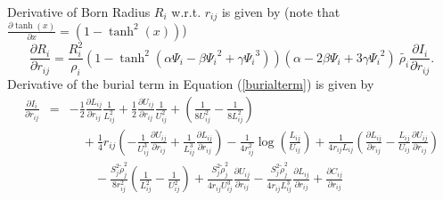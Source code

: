 \documentclass[12pt]{article}
\begin{document}
Derivative of Born Radius $R_{i}$ w.r.t. $r_{ij}$ is given by
(note that $\frac{\partial \tanh(x)}{\partial x} = (1-\tanh^{2}(x))$)
\begin{equation}
\label{bornradiiderivative}
\frac{\partial R_{i}}{\partial r_{ij}} = \frac{R_{i}^{2}}{\rho_{i}}\left(1 - {\tanh}^{2}\left({{\alpha}{\Psi_{i}} - {\beta}{\Psi_{i}}^{2} + {\gamma}
     {\Psi_{i}}^{3}}\right)\right)\left({\alpha} - 2{\beta}{\Psi_{i}} + 3{\gamma}{\Psi_{i}}^{2}\right)
     ~\tilde{\rho_{i}}\frac{\partial {I_{i}}}{\partial r_{ij}}
     .
\end{equation}
Derivative of the burial term in Equation (\ref{burialterm}) is given by
\begin{eqnarray}
\frac{\partial I_{i}}{\partial r_{ij}} & = & -\frac{1}{2}\frac{\partial L_{ij}}{\partial r_{ij}}\frac{1}{L_{ij}^2} + 
  \frac{1}{2}\frac{\partial U_{ij}}{\partial r_{ij}}\frac{1}{U_{ij}^2} + \left(\frac{1}{8 U_{ij}^2}-\frac{1}{8 L_{ij}^2}\right) \nonumber \\
  & & \quad + \frac{1}{4}r_{ij}
  \left(-\frac{1}{U_{ij}^{3}}\frac{\partial U_{ij}}{\partial r_{ij}}
  + \frac{1}{L_{ij}^{3}}\frac{\partial L_{ij}}{\partial r_{ij}}\right)
  -\frac{1}{4r_{ij}^{2}}\log\left({\frac{L_{ij}}{U_{ij}}}\right) +
  \frac{1}{4r_{ij}L_{ij}}\left(\frac{\partial L_{ij}}{\partial r_{ij}} - \frac{L_{ij}}{U_{ij}}\frac{\partial U_{ij}}{\partial r_{ij} } \right) \nonumber \\
  & & \qquad 
  -\frac{S_{j}^{2} {\tilde\rho}_{j}^{2}}{8r_{ij}^{2}}\left(\frac{1}{L_{ij}^{2}} - \frac{1}{U_{ij}^{2}} \right) +
  \frac{S_{j}^{2}{\tilde\rho}_{j}^{2}}{4r_{ij}U_{ij}^{3}}\frac{\partial U_{ij}}{\partial r_{ij}} 
  - \frac{S_{j}^{2}{\tilde\rho}_{j}^{2}}{4r_{ij}L_{ij}^{3}}\frac{\partial L_{ij}}{\partial r_{ij}}
  + \frac{\partial C_{ij}}{\partial r_{ij}}
\end{eqnarray}  
\end{document}
